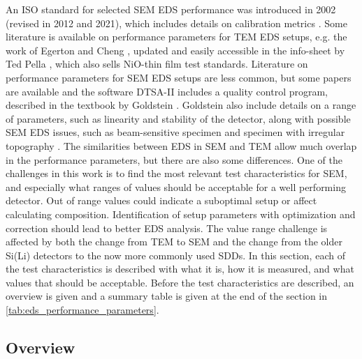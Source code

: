An ISO standard for selected SEM EDS performance was introduced in 2002 (revised in 2012 and 2021), which includes details on calibration metrics \cite{iso_qc_15632}.
Some literature is available on performance parameters for TEM EDS setups, e.g. the work of Egerton and Cheng \cite{egerton_nio_characterization_1994}, updated and easily accessible in the info-sheet by Ted Pella \cite{ted_pella_nio_tem_2019}, which also sells NiO-thin film test standards.
Literature on performance parameters for SEM EDS setups are less common, but some papers \cite{software_dtsaii,dtsaii_1_getting_started,dtsaii_2_manipulating_spectra} are available and the software DTSA-II \cite{software_dtsaii} includes a quality control program, described in the textbook by Goldstein \cite{goldstein_scanning_2018}.
Goldstein also include details on a range of parameters, such as linearity and stability of the detector, along with possible SEM EDS issues, such as beam-sensitive specimen and specimen with irregular topography \cite{goldstein_scanning_2018}.
The similarities between EDS in SEM and TEM allow much overlap in the performance parameters, but there are also some differences.
One of the challenges in this work is to find the most relevant test characteristics for SEM, and especially what ranges of values should be acceptable for a well performing detector.
Out of range values could indicate a suboptimal setup or affect calculating composition.
Identification of setup parameters with optimization and correction should lead to better EDS analysis.
The value range challenge is affected by both the change from TEM to SEM and the change from the older Si(Li) detectors to the now more commonly used SDDs.
In this section, each of the test characteristics is described with what it is, how it is measured, and what values that should be acceptable.
Before the test characteristics are described, an overview is given and a summary table is given at the end of the section in \cref{tab:eds_performance_parameters}.


\subsection{Overview}
\label{theory:eds_performance:overview}



